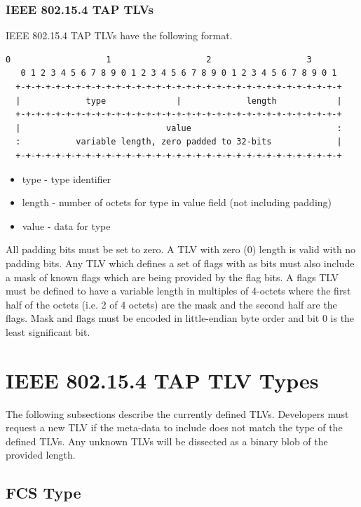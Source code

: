 \documentclass[12pt]{article}
\renewcommand\_{\textunderscore\allowbreak}
\begin{document}
\newpage
\subsubsection{IEEE 802.15.4 TAP TLVs}

IEEE 802.15.4 TAP TLVs have the following format.

\begin{Verbatim}[samepage=true]
   0                   1                   2                   3
   0 1 2 3 4 5 6 7 8 9 0 1 2 3 4 5 6 7 8 9 0 1 2 3 4 5 6 7 8 9 0 1
  +-+-+-+-+-+-+-+-+-+-+-+-+-+-+-+-+-+-+-+-+-+-+-+-+-+-+-+-+-+-+-+-+
  |             type              |             length            |
  +-+-+-+-+-+-+-+-+-+-+-+-+-+-+-+-+-+-+-+-+-+-+-+-+-+-+-+-+-+-+-+-+
  |                             value                             :
  :           variable length, zero padded to 32-bits             |
  +-+-+-+-+-+-+-+-+-+-+-+-+-+-+-+-+-+-+-+-+-+-+-+-+-+-+-+-+-+-+-+-+
\end{Verbatim}

\begin{itemize}
    \item type        - type identifier
    \item length      - number of octets for type in value field
                        (not including padding)
    \item value       - data for type
\end{itemize}
All padding bits must be set to zero.  A TLV with zero (0) length is valid with
no padding bits.  Any TLV which defines a set of flags with as bits must also
include a mask of known flags which are being provided by the flag bits.  A
flags TLV must be defined to have a variable length in multiples of 4-octets
where the first half of the octets (i.e. 2 of 4 octets) are the mask and the
second half are the flags.  Mask and flags must be encoded in little-endian
byte order and bit 0 is the least significant bit.

\newpage
\section{IEEE 802.15.4 TAP TLV Types}

The following subsections describe the currently defined TLVs.  Developers must
request a new TLV if the meta-data to include does not match the type of the
defined TLVs.  Any unknown TLVs will be dissected as a binary blob of the
provided length.  

\subsection{FCS Type}
\end{document}

